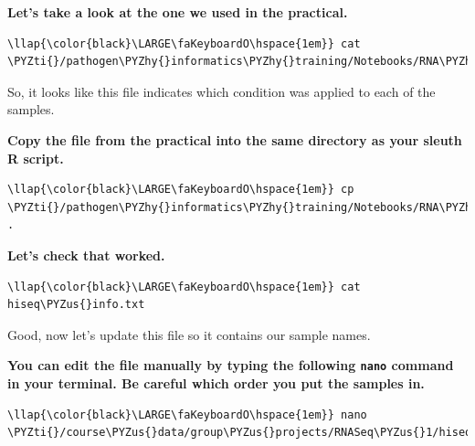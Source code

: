 \documentclass[11pt]{article}
\def\PYZus{\char`\_}
\def\PYZhy{\char`\-}
\def\PYZti{\char`\~}
\begin{document}
\textbf{Let's take a look at the one we used in the practical.}

\begin{terminalinput}
\begin{Verbatim}[commandchars=\\\{\}]
\llap{\color{black}\LARGE\faKeyboardO\hspace{1em}} cat \PYZti{}/pathogen\PYZhy{}informatics\PYZhy{}training/Notebooks/RNA\PYZhy{}Seq/data/hiseq\PYZus{}info.txt
\end{Verbatim}
\end{terminalinput}


    So, it looks like this file indicates which condition was applied to
each of the samples.

\textbf{Copy the file from the practical into the same directory as your
sleuth R script.}

\begin{terminalinput}
\begin{Verbatim}[commandchars=\\\{\}]
\llap{\color{black}\LARGE\faKeyboardO\hspace{1em}} cp \PYZti{}/pathogen\PYZhy{}informatics\PYZhy{}training/Notebooks/RNA\PYZhy{}Seq/data/hiseq\PYZus{}info.txt .
\end{Verbatim}
\end{terminalinput}


    \textbf{Let's check that worked.}

\begin{terminalinput}
\begin{Verbatim}[commandchars=\\\{\}]
\llap{\color{black}\LARGE\faKeyboardO\hspace{1em}} cat hiseq\PYZus{}info.txt
\end{Verbatim}
\end{terminalinput}


    Good, now let's update this file so it contains our sample names.

\textbf{You can edit the file manually by typing the following
\texttt{nano} command in your terminal. Be careful which order you put
the samples in.}

\begin{terminalinput}
\begin{Verbatim}[commandchars=\\\{\}]
\llap{\color{black}\LARGE\faKeyboardO\hspace{1em}} nano \PYZti{}/course\PYZus{}data/group\PYZus{}projects/RNASeq\PYZus{}1/hiseq\PYZus{}info.txt
\end{Verbatim}
\end{terminalinput}
\end{document}
